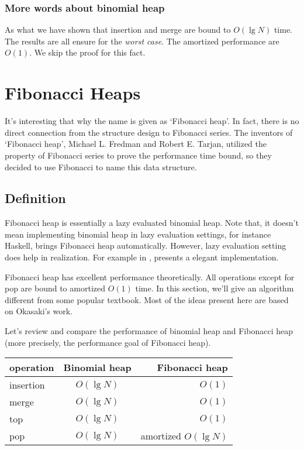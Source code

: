 \documentclass{article}
\begin{document}
\subsubsection{More words about binomial heap}
As what we have shown that insertion and merge are bound to $O(\lg N)$
time. The results are all ensure for the {\em worst case}. The 
amortized performance are $O(1)$. We skip the proof for this
fact.

\section{Fibonacci Heaps}
\label{fib-heap} 

It's interesting that why the name is given as `Fibonacci heap'.
In fact, there is no direct connection from the structure design
to Fibonacci series. The inventors of `Fibonacci heap', Michael L.
Fredman and Robert E. Tarjan, utilized the property of Fibonacci series
to prove the performance time bound, so they decided to use Fibonacci
to name this data structure.\cite{CLRS} 

\subsection{Definition}

Fibonacci heap is essentially a lazy evaluated binomial heap. Note
that, it doesn't mean implementing binomial heap in lazy evaluation
settings, for instance Haskell, brings Fibonacci heap automatically.
However, lazy evaluation setting does help in realization. For example
in \cite{hackage-fibq}, presents a elegant implementation.

Fibonacci heap has excellent performance theoretically. All operations
except for pop are bound to amortized $O(1)$ time. In this section,
we'll give an algorithm different from some popular textbook\cite{CLRS}.
Most of the ideas present here are based on Okasaki's work\cite{okasaki-fibh}.

Let's review and compare the performance of binomial heap and Fibonacci
heap (more precisely, the performance goal of Fibonacci heap).

\begin{tabular}{l | c | r}
  \hline
  operation & Binomial heap & Fibonacci heap \\
  \hline
  insertion & $O(\lg N)$ & $O(1)$ \\
  merge & $O(\lg N)$ & $O(1)$ \\
  top & $O(\lg N)$ & $O(1)$ \\
  pop & $O(\lg N)$ & amortized $O(\lg N)$ \\
  \hline
\end{tabular}
\end{document}
